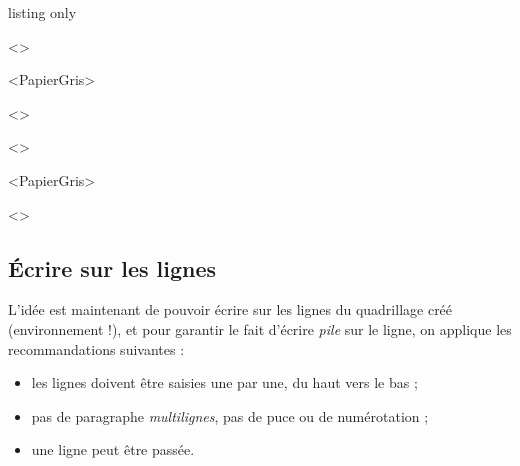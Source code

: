 \documentclass[a4paper]{article}
\begin{document}
\begin{PresentationCode}{listing only}

\begin{EnvQuadrillage}[NbCarreaux=18x4,Grille=Seyes,Marge=3]<\CoulSeyes>
\end{EnvQuadrillage}

\begin{EnvQuadrillage}[NbCarreaux=36x8,Elargir=3/3]<PapierGris>
\end{EnvQuadrillage}

\begin{center}
	\begin{EnvQuadrillage}[NbCarreaux=12x3,Elargir=2/2,Grille=Ruled,Marge=2]<\CoulRuled>
	\end{EnvQuadrillage}
\end{center}
\end{PresentationCode}

\medskip

\begin{EnvQuadrillage}[NbCarreaux=18x4,Grille=Seyes,Marge=3]<\CoulSeyes>
\end{EnvQuadrillage}

\smallskip

\begin{EnvQuadrillage}[NbCarreaux=36x8,Elargir=3/3,Cadre]<PapierGris>
\end{EnvQuadrillage}

\begin{center}
	\begin{EnvQuadrillage}[NbCarreaux=12x3,Grille=Ruled,Marge=2]<\CoulRuled>
\end{EnvQuadrillage}
\end{center}

\pagebreak

\subsection{Écrire sur les lignes}

L'idée est maintenant de pouvoir écrire sur les lignes du quadrillage créé (environnement !), et pour garantir le fait d'écrire \textit{pile} sur le ligne, on applique les recommandations suivantes :

\begin{itemize}
	\item les lignes doivent être saisies une par une, du \og haut \fg{} vers le \og bas \fg{} ;
	\item pas de paragraphe \textit{multilignes}, pas de puce ou de numérotation ;
	\item une ligne peut être passée.
\end{itemize}
\end{document}

